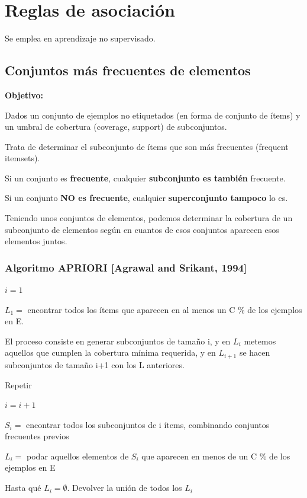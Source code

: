 \documentclass[12pt, twoside, openright]{report} %
\begin{document}
\section{Reglas de asociación}
Se emplea en aprendizaje no supervisado.

\subsection{Conjuntos más frecuentes de elementos}
\textbf{Objetivo:}

Dados un conjunto de ejemplos no etiquetados (en forma de conjunto de ítems) y un umbral de cobertura (coverage, support) de subconjuntos.

Trata de determinar el subconjunto de ítems que son más frecuentes (frequent itemsets).

Si un conjunto es \textbf{frecuente}, cualquier \textbf{subconjunto es también} frecuente.

Si un conjunto \textbf{NO es frecuente}, cualquier \textbf{superconjunto tampoco} lo es.

Teniendo unos conjuntos de elementos, podemos determinar la cobertura de un subconjunto de elementos según en cuantos de esos conjuntos aparecen esos elementos juntos.

\subsubsection{Algoritmo APRIORI [Agrawal and Srikant, 1994]}

$i = 1$

$L_1 =$ encontrar todos los ítems que aparecen en al menos un C \% de los ejemplos en E.

El proceso consiste en generar subconjuntos de tamaño i, y en $L_i$ metemos aquellos que cumplen la cobertura mínima requerida, y en $L_{i+1}$ se hacen subconjuntos de tamaño i+1 con los L anteriores.

Repetir

\hspace{6mm} $i = i + 1$

\hspace{6mm} $S_i =$ encontrar todos los subconjuntos de i ítems, combinando conjuntos frecuentes previos

\hspace{6mm} $L_i =$ podar aquellos elementos de $S_i$ que aparecen en menos de un C \% de los ejemplos en E

Hasta qué $L_i = \emptyset$. Devolver la unión de todos los $L_i$
\end{document}
